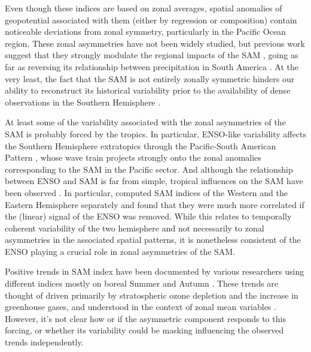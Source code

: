 \documentclass[smallextended]{svjour3}       %
\begin{document}
Even though these indices are based on zonal averages, spatial anomalies of geopotential associated with them (either by regression or composition) contain noticeable deviations from zonal symmetry, particularly in the Pacific Ocean region. These zonal asymmetries have not been widely studied, but previous work suggest that they strongly modulate the regional impacts of the SAM \citep{fan2007, fogt2012, rosso2018}, going as far as reversing its relationship between precipitation in South America \citep{silvestri2009}. At the very least, the fact that the SAM is not entirely zonally symmetric hinders our ability to reconstruct its historical variability prior to the availability of dense observations in the Southern Hemisphere \citep{jones2009}.

At least some of the variability associated with the zonal asymmetries of the SAM is probably forced by the tropics. In particular, ENSO-like variability affects the Southern Hemisphere extratopics through the Pacific-South American Pattern \citep{mo1987, kidson1988, karoly1989}, whose wave train projects strongly onto the zonal anomalies corresponding to the SAM in the Pacific sector. And although the relationship between ENSO and SAM is far from simple, tropical influences on the SAM have been observed \citep{fan2007, fogt2011, clem2013}. In particular, \citet{fan2007} computed SAM indices of the Western and the Eastern Hemisphere separately and found that they were much more correlated if the (linear) signal of the ENSO was removed. While this relates to temporally coherent variability of the two hemisphere and not necessarily to zonal asymmetries in the associated spatial patterns, it is nonetheless consistent of the ENSO playing a crucial role in zonal asymmetries of the SAM.

Positive trends in SAM index have been documented by various researchers using different indices mostly on boreal Summer and Autumn \citep[e.g.][ and references therein]{fogt2020}. These trends are thought of driven primarily by stratospheric ozone depletion and the increase in greenhouse gases, and understood in the context of zonal mean variables \citep{marshall2004, gillett2005, arblaster2006, gillett2013}. However, it's not clear how or if the asymmetric component responds to this forcing, or whether its variability could be masking influencing the observed trends independently.
\end{document}
